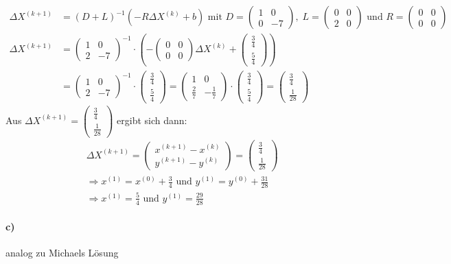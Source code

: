 \begin{align*}
\Delta X^{(k+1)}&=(D+L)^{-1}(-R\Delta X^{(k)}+b) \text{ mit }D=\begin{pmatrix} 1 & 0\\0 & -7 \end{pmatrix},\; L=\begin{pmatrix}
0 & 0 \\ 2 & 0\end{pmatrix} \text{ und } R=\begin{pmatrix}
0 & 0 \\ 0 & 0 \end{pmatrix}\\
\Delta X^{(k+1)}&= \begin{pmatrix} 1 & 0\\2 & -7 \end{pmatrix}^{-1}\cdot\left(-\begin{pmatrix}0 & 0 \\ 0 & 0 \end{pmatrix} \Delta X^{(k)}+ \begin{pmatrix}\frac{3}{4} \\ \frac{5}{4}\end{pmatrix}\right)\\
&= \begin{pmatrix} 1 & 0\\2 & -7 \end{pmatrix}^{-1}\cdot \begin{pmatrix}\frac{3}{4} \\ \frac{5}{4}\end{pmatrix}=\begin{pmatrix} 1 & 0\\\frac{2}{7} & -\frac{1}{7} \end{pmatrix}\cdot \begin{pmatrix}\frac{3}{4} \\ \frac{5}{4}\end{pmatrix}=\begin{pmatrix}
\frac{3}{4}\\\frac{1}{28}
\end{pmatrix}
\end{align*}
Aus $\Delta X^{(k+1)}=\begin{pmatrix}
\frac{3}{4}\\\frac{1}{28}
\end{pmatrix}$ ergibt sich dann:
\begin{align*}
&\Delta X^{(k+1)}=\begin{pmatrix}
x^{(k+1)}-x^{(k)} \\ y^{(k+1)}-y^{(k)}\end{pmatrix}=\begin{pmatrix}
\frac{3}{4}\\\frac{1}{28}
\end{pmatrix}\\
&\Rightarrow x^{(1)}=x^{(0)}+\frac{3}{4} \text{ und } y^{(1)}=y^{(0)}+\frac{31}{28}\\
&\Rightarrow x^{(1)}=\frac{5}{4} \text{ und } y^{(1)}=\frac{29}{28}
\end{align*}
\paragraph{c)} analog zu Michaels Lösung